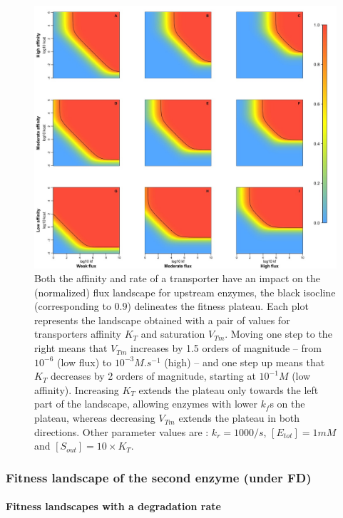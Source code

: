 \begin{figure}[h!]
\centering
\includegraphics[scale=0.41,trim=0.2cm 0 0 0cm,clip]{pics/SM-Enzymes/Fit_Landscape2D_Sensitivity.jpeg} 
\caption{Both the affinity and rate of a transporter have an impact on the (normalized) flux landscape for upstream enzymes, the black isocline (corresponding to $0.9$) delineates the fitness plateau. Each plot represents the landscape obtained with a pair of values for transporters affinity $K_T$ and saturation $V_{Tm}$. Moving one step to the right means that $V_{Tm}$ increases by 1.5 orders of magnitude -- from $10^{-6}$ (low flux) to $10^{-3} M.s^{-1}$ (high) -- and one step up means that $K_T$ decreases by 2 orders of magnitude, starting at $10^{-1}M$ (low affinity). Increasing $K_T$ extends the plateau only towards the left part of the landscape, allowing enzymes with lower $k_f$s on the plateau, whereas decreasing $V_{Tm}$ extends the plateau in both directions. Other parameter values are : $k_r=1000/s$, $[E_{tot}]=1mM$ and $[S_{out}]=10 \times K_T$.}
\label{fig3FD-ann}
\end{figure}

\subsubsection{Fitness landscape of the second enzyme (under FD)\label{sec:FP2}}

\noindent\paragraph{Fitness landscapes with a degradation rate}

